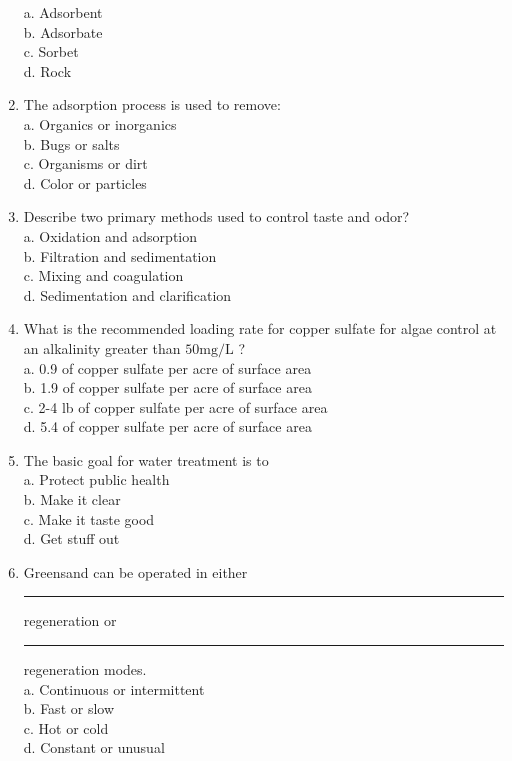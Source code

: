 \begin{enumerate}[1.]
a. Adsorbent\\
b. Adsorbate\\
c. Sorbet\\
d. Rock\\
\item The adsorption process is used to remove:\\
a. Organics or inorganics\\
b. Bugs or salts\\
c. Organisms or dirt\\
d. Color or particles\\
\item Describe two primary methods used to control taste and odor?\\
a. Oxidation and adsorption\\
b. Filtration and sedimentation\\
c. Mixing and coagulation\\
d. Sedimentation and clarification\\
\item What is the recommended loading rate for copper sulfate for algae control at an alkalinity greater than $50 \mathrm{mg} / \mathrm{L}$ ?\\
a. 0.9 of copper sulfate per acre of surface area\\
b. 1.9 of copper sulfate per acre of surface area\\
c. 2-4 lb of copper sulfate per acre of surface area\\
d. 5.4 of copper sulfate per acre of surface area\\
\item The basic goal for water treatment is to\\
a. Protect public health\\
b. Make it clear\\
c. Make it taste good\\
d. Get stuff out\\
\item Greensand can be operated in either \rule{1.5cm}{0.5pt} regeneration or \rule{1.5cm}{0.5pt} regeneration modes.\\
a. Continuous or intermittent\\
b. Fast or slow\\
c. Hot or cold\\
d. Constant or unusual\\

\end{enumerate}



